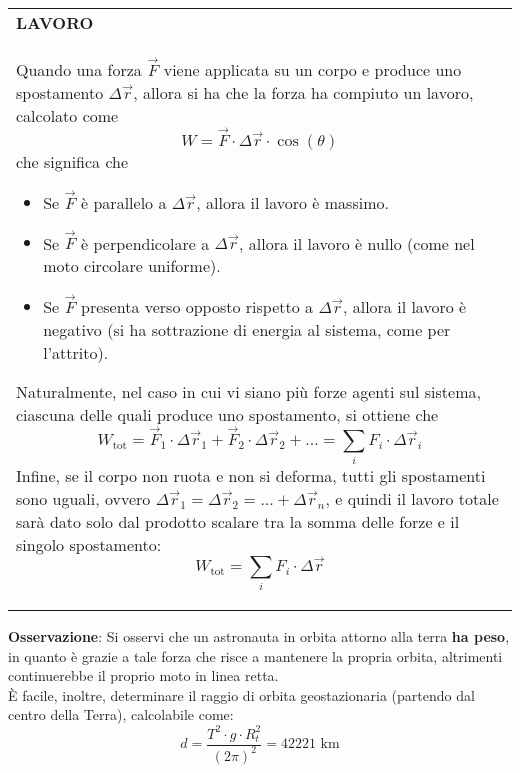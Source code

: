 \documentclass[a4paper]{extarticle}
\renewcommand\arraystretch{}
\begin{document}
\vspace{1em}
\setlength{\tabcolsep}{14pt}
\renewcommand{\arraystretch}{2}
\noindent
\begin{tabularx}{\textwidth}{@{}|P|@{}}
    \hline
    {\textbf{LAVORO}}\\
    \parbox{\linewidth}{Quando una forza $\vec F$ viene applicata su un corpo e produce uno spostamento $\Delta \vec r$, allora si ha che la forza ha compiuto un lavoro, calcolato come
    \[\boxed{W = \vec F \cdot \Delta \vec r \cdot \cos(\theta)}\]
    che significa che
    \begin{itemize}
      \item Se $\vec F$ è parallelo a $\Delta \vec r$, allora il lavoro è massimo.
      \item Se $\vec F$ è perpendicolare a $\Delta \vec r$, allora il lavoro è nullo (come nel moto circolare uniforme).
      \item Se $\vec F$ presenta verso opposto rispetto a $\Delta \vec r$, allora il lavoro è negativo (si ha sottrazione di energia al sistema, come per l'attrito).
    \end{itemize}
    Naturalmente, nel caso in cui vi siano più forze agenti sul sistema, ciascuna delle quali produce uno spostamento, si ottiene che
    \[W_{\text{tot}} = \vec F_1 \cdot \Delta \vec r_1 + \vec F_2 \cdot \Delta \vec r_2 + ... = \sum_{i} F_i \cdot \Delta \vec r_i\]
    Infine, se il corpo non ruota e non si deforma, tutti gli spostamenti sono uguali, ovvero $\Delta \vec r_1 = \Delta \vec r_2 = ... + \Delta \vec r_n$, e quindi il lavoro totale sarà dato solo dal prodotto scalare tra la somma delle forze e il singolo spostamento:
    \[W_{\text{tot}} = \sum_{i} F_i \cdot \Delta \vec r\]
    \vspace{-1mm}}\\
    \hline
\end{tabularx}

\vspace{2em}
\noindent
\textbf{Osservazione}: Si osservi che un astronauta in orbita attorno alla terra \textbf{ha peso}, in quanto è grazie a tale forza che risce a mantenere la propria orbita, altrimenti continuerebbe il proprio moto in linea retta.\\
È facile, inoltre, determinare il raggio di orbita geostazionaria (partendo dal centro della Terra), calcolabile come:
\[d=\frac{T^2 \cdot g \cdot R_t^2}{(2 \pi)^2} = 42 221 \text{ km}\]
\end{document}
